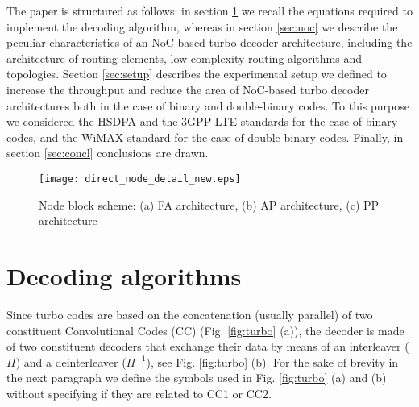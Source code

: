 \documentclass[10pt,twocolumn,journal]{IEEEtran}
\begin{document}
The paper is structured as follows: in section \ref{sec:theory} we recall the equations required to implement the 
decoding algorithm, whereas in section \ref{sec:noc} we describe the peculiar characteristics of an NoC-based turbo 
decoder architecture, including the architecture of routing elements, low-complexity routing algorithms and topologies.
Section \ref{sec:setup} describes the experimental setup we defined to increase the throughput and reduce the area 
of NoC-based turbo decoder architectures both in the case of binary and double-binary codes. To this purpose 
we considered the HSDPA and the 3GPP-LTE standards for the case of binary codes, and the WiMAX standard for the 
case of double-binary codes. Finally, in section \ref{sec:concl} conclusions are drawn.
\begin{figure*}[t!]
  \centering
  \texttt{[image: direct\_node\_detail\_new.eps]}
\caption{Node block scheme: 
(a) FA architecture, 
(b) AP architecture, 
(c) PP architecture}
\label{fig:nodes}
\end{figure*}

\section{Decoding algorithms}
\label{sec:theory}

Since turbo codes are based on the concatenation (usually parallel) 
of two constituent Convolutional Codes (CC) (Fig. \ref{fig:turbo} (a)), the decoder is made of 
two constituent decoders that exchange their data by means of an interleaver ($\Pi$) and a deinterleaver ($\Pi^{-1}$), 
see Fig. \ref{fig:turbo} (b). For the sake of brevity in the next paragraph 
we define the symbols used in Fig. \ref{fig:turbo} (a) and (b) 
without specifying if they are related to CC1 or CC2.
\end{document}
